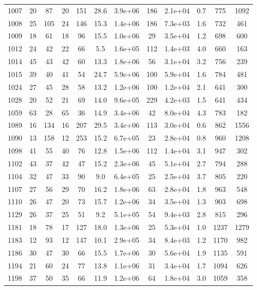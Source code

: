 \begin{table}
\begin{tabular}{cccccccccccc}
1007 & 20 & 87 & 20 & 151 & 28.6 & 3.9e+06 & 186 & 2.1e+04 & 0.7 & 775 & 1092 \\
1008 & 25 & 105 & 24 & 146 & 15.3 & 1.4e+06 & 186 & 7.3e+03 & 1.6 & 732 & 461 \\
1009 & 18 & 61 & 18 & 96 & 15.5 & 1.0e+06 & 29 & 3.5e+04 & 1.2 & 698 & 600 \\
1012 & 24 & 42 & 22 & 66 & 5.5 & 1.6e+05 & 112 & 1.4e+03 & 4.0 & 660 & 163 \\
1014 & 45 & 43 & 42 & 60 & 13.3 & 1.8e+06 & 56 & 3.1e+04 & 3.2 & 756 & 239 \\
1015 & 39 & 40 & 41 & 54 & 24.7 & 5.9e+06 & 100 & 5.9e+04 & 1.6 & 784 & 481 \\
1024 & 27 & 45 & 28 & 58 & 13.2 & 1.2e+06 & 100 & 1.2e+04 & 2.1 & 641 & 300 \\
1028 & 20 & 52 & 21 & 69 & 14.0 & 9.6e+05 & 229 & 4.2e+03 & 1.5 & 641 & 434 \\
1059 & 63 & 28 & 65 & 36 & 14.9 & 3.4e+06 & 42 & 8.0e+04 & 4.3 & 783 & 182 \\
1089 & 16 & 134 & 16 & 207 & 29.5 & 3.4e+06 & 113 & 3.0e+04 & 0.6 & 862 & 1556 \\
1090 & 13 & 158 & 12 & 253 & 15.2 & 6.7e+05 & 23 & 2.8e+04 & 0.8 & 960 & 1208 \\
1098 & 41 & 55 & 40 & 76 & 12.8 & 1.5e+06 & 112 & 1.4e+04 & 3.1 & 947 & 302 \\
1102 & 43 & 37 & 42 & 47 & 15.2 & 2.3e+06 & 45 & 5.1e+04 & 2.7 & 794 & 288 \\
1104 & 32 & 47 & 33 & 90 & 9.0 & 6.4e+05 & 25 & 2.5e+04 & 3.7 & 805 & 220 \\
1107 & 27 & 56 & 29 & 70 & 16.2 & 1.8e+06 & 63 & 2.8e+04 & 1.8 & 963 & 548 \\
1110 & 26 & 47 & 20 & 73 & 15.7 & 1.2e+06 & 34 & 3.5e+04 & 1.3 & 903 & 698 \\
1129 & 26 & 37 & 25 & 51 & 9.2 & 5.1e+05 & 54 & 9.4e+03 & 2.8 & 815 & 296 \\
1181 & 18 & 78 & 17 & 127 & 18.0 & 1.3e+06 & 25 & 5.3e+04 & 1.0 & 1237 & 1279 \\
1183 & 12 & 93 & 12 & 147 & 10.1 & 2.9e+05 & 34 & 8.4e+03 & 1.2 & 1170 & 982 \\
1186 & 30 & 47 & 30 & 66 & 15.5 & 1.7e+06 & 30 & 5.6e+04 & 1.9 & 1135 & 591 \\
1194 & 21 & 60 & 24 & 77 & 13.8 & 1.1e+06 & 31 & 3.4e+04 & 1.7 & 1094 & 626 \\
1198 & 37 & 50 & 35 & 66 & 11.9 & 1.2e+06 & 64 & 1.8e+04 & 3.0 & 1059 & 358 \\

\end{tabular}
\end{table}
